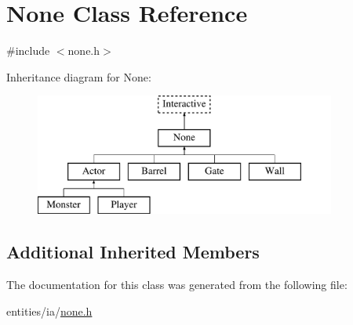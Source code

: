 \hypertarget{class_none}{\section{None Class Reference}
\label{class_none}
}


{\ttfamily \#include $<$none.\-h$>$}

Inheritance diagram for None\-:\begin{figure}[H]
\begin{center}
\leavevmode
\includegraphics[height=4.000000cm]{class_none}
\end{center}
\end{figure}
\subsection*{Additional Inherited Members}


The documentation for this class was generated from the following file\-:\begin{DoxyCompactItemize}
\item 
entities/ia/\hyperlink{none_8h}{none.\-h}\end{DoxyCompactItemize}
